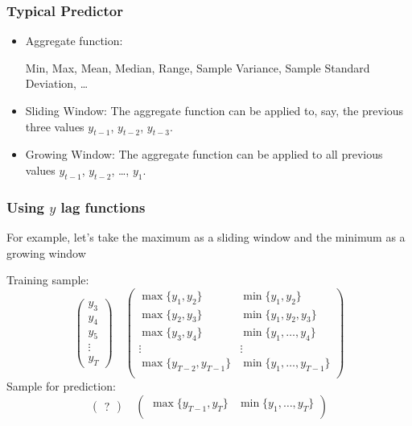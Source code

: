 \begin{frame}
	\frametitle{Typical Predictor}
	
	\begin{itemize}[<+->]
		\item \alert{Aggregate function}:
		
		Min, Max, Mean, Median, Range, Sample Variance, Sample Standard Deviation, \ldots
		
		\item 		
		\alert{Sliding Window}: The aggregate function can be applied to, say, the previous three values $y_{t-1}$, $y_{t-2}$, $y_{t-3}$.
		
		\item 		
		\alert{Growing Window}: The aggregate function can be applied to all previous values $y_{t-1}$, $y_{t-2}$, \ldots, $y_{1}$.
	\end{itemize}
	
\end{frame}


\begin{frame}
	\frametitle{Using $y$ lag functions}
	
	For example, let's take the maximum as a sliding window and the minimum as a growing window
	\pause
	
	\alert{Training} sample:
	\[
	\begin{pmatrix}
		y_3 \\
		y_4 \\
		y_5 \\
		\vdots \\
		y_T
	\end{pmatrix} \quad
	\begin{pmatrix}
		\max\{y_1, y_2\} & \min\{y_1, y_2\} \\
		\max\{y_2, y_3\} & \min\{y_1, y_2, y_3\} \\
		\max\{y_3, y_4\} & \min\{y_1, \ldots, y_4\} \\
		\vdots & \vdots \\
		\max\{y_{T-2}, y_{T-1}\} & \min\{y_1, \ldots, y_{T-1}\} \\
	\end{pmatrix}
	\]
	\pause
	Sample for \alert{prediction}:
	\[
	\begin{pmatrix}
		?
	\end{pmatrix} \quad
	\begin{pmatrix}
		\max\{y_{T-1}, y_{T}\} & \min\{y_1, \ldots, y_{T}\} \\
	\end{pmatrix}
	\]
	
\end{frame}




